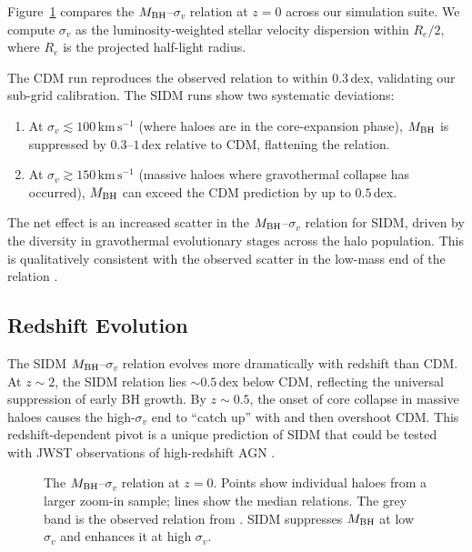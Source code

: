 \documentclass[fleqn,usenatbib]{mnras}
\newcommand{\kms}{\,\mathrm{km\,s^{-1}}}
\newcommand{\MBH}{M_{\rm BH}}
\newcommand{\vdisp}{\sigma_v}
\begin{document}
Figure~\ref{fig:mbh_sigma} compares the $\MBH$--$\vdisp$ relation at
$z=0$ across our simulation suite.  We compute $\vdisp$ as the
luminosity-weighted stellar velocity dispersion within $R_e/2$, where
$R_e$ is the projected half-light radius.

The CDM run reproduces the observed \citet{Kormendy2013} relation to
within $0.3$\,dex, validating our sub-grid calibration.  The SIDM
runs show two systematic deviations:
\begin{enumerate}
  \item At $\vdisp \lesssim 100\kms$ (where haloes are in the
    core-expansion phase), $\MBH$ is suppressed by $0.3$--$1$\,dex
    relative to CDM, flattening the relation.
  \item At $\vdisp \gtrsim 150\kms$ (massive haloes where
    gravothermal collapse has occurred), $\MBH$ can exceed the CDM
    prediction by up to $0.5$\,dex.
\end{enumerate}

The net effect is an increased scatter in the $\MBH$--$\vdisp$
relation for SIDM, driven by the diversity in gravothermal evolutionary
stages across the halo population.  This is qualitatively consistent
with the observed scatter in the low-mass end of the relation
\citep{Greene2020}.

\subsection{Redshift Evolution}

The SIDM $\MBH$--$\vdisp$ relation evolves more dramatically with
redshift than CDM.  At $z \sim 2$, the SIDM relation lies $\sim
0.5$\,dex below CDM, reflecting the universal suppression of early BH
growth.  By $z \sim 0.5$, the onset of core collapse in massive haloes
causes the high-$\vdisp$ end to ``catch up'' with and then overshoot
CDM.  This redshift-dependent pivot is a unique prediction of SIDM
that could be tested with JWST observations of high-redshift AGN
\citep{Harikane2023,Maiolino2024}.

\begin{figure}
  \centering
  \caption{The $\MBH$--$\vdisp$ relation at $z=0$.  Points show
    individual haloes from a larger zoom-in sample; lines show the
    median relations.  The grey band is the observed relation from
    \citet{Kormendy2013}.  SIDM suppresses $\MBH$ at low $\vdisp$ and
    enhances it at high $\vdisp$.}
  \label{fig:mbh_sigma}
\end{figure}
\end{document}
